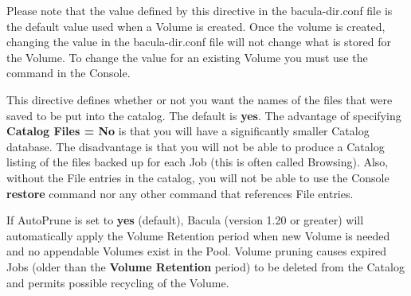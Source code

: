 \begin{description}
   Please note that the value defined by this directive in the  bacula-dir.conf
   file is the default value used when a Volume  is created. Once the volume is
   created, changing the value  in the bacula-dir.conf file will not change what
   is stored  for the Volume. To change the value for an existing Volume  you
   must use the 
    command in the Console.  

\item [Catalog Files = \lt{}yes\vb{}no\gt{}]
   This directive defines whether or not you want the names of the files
   that were saved to be put into the catalog.  The default is {\bf yes}.
   The advantage of specifying {\bf Catalog Files = No} is that you will
   have a significantly smaller Catalog database.  The disadvantage is that
   you will not be able to produce a Catalog listing of the files backed up
   for each Job (this is often called Browsing).  Also, without the File
   entries in the catalog, you will not be able to use the Console {\bf
   restore} command nor any other command that references File entries.
   
\label{PoolAutoPrune}
\item [AutoPrune = \lt{}yes\vb{}no\gt{}]
   If AutoPrune is set to {\bf yes} (default), Bacula (version 1.20 or
   greater) will automatically apply the Volume Retention period when new
   Volume is needed and no appendable Volumes exist in the Pool.  Volume
   pruning causes expired Jobs (older than the {\bf Volume Retention}
   period) to be deleted from the Catalog and permits possible recycling of
   the Volume.
   

\end{description}
